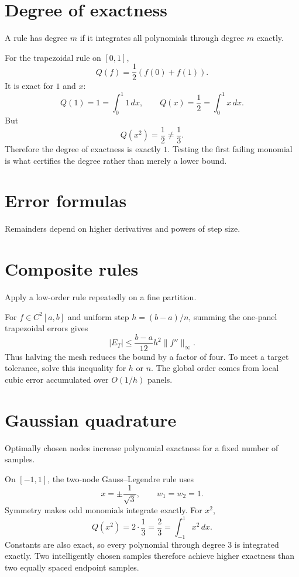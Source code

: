 \section{Degree of exactness}
A rule has degree $m$ if it integrates all polynomials through degree $m$ exactly.


\begin{example}\label{ex:ii24-expand-01}
For the trapezoidal rule on \([0,1]\),
\[
Q(f)=\frac12(f(0)+f(1)).
\]
It is exact for \(1\) and \(x\):
\[
Q(1)=1=\int_0^1 1\,dx,\qquad
Q(x)=\frac12=\int_0^1x\,dx.
\]
But
\[
Q(x^2)=\frac12\ne\frac13.
\]
Therefore the degree of exactness is exactly \(1\). Testing the first failing
monomial is what certifies the degree rather than merely a lower bound.
\end{example}
\section{Error formulas}
Remainders depend on higher derivatives and powers of step size.

\section{Composite rules}
Apply a low-order rule repeatedly on a fine partition.


\begin{example}\label{ex:ii24-expand-02}
For \(f\in C^2[a,b]\) and uniform step \(h=(b-a)/n\), summing the one-panel
trapezoidal errors gives
\[
|E_T|\le \frac{b-a}{12}h^2\|f''\|_\infty.
\]
Thus halving the mesh reduces the bound by a factor of four. To meet a target
tolerance, solve this inequality for \(h\) or \(n\). The global order comes
from local cubic error accumulated over \(O(1/h)\) panels.
\end{example}
\section{Gaussian quadrature}
Optimally chosen nodes increase polynomial exactness for a fixed number of samples.


\begin{example}\label{ex:ii24-expand-03}
On \([-1,1]\), the two-node Gauss--Legendre rule uses
\[
x=\pm\frac1{\sqrt3},\qquad w_1=w_2=1.
\]
Symmetry makes odd monomials integrate exactly. For \(x^2\),
\[
Q(x^2)=2\cdot\frac13=\frac23=\int_{-1}^1x^2\,dx.
\]
Constants are also exact, so every polynomial through degree \(3\) is integrated
exactly. Two intelligently chosen samples therefore achieve higher exactness
than two equally spaced endpoint samples.
\end{example}
